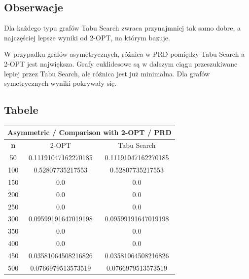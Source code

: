 \documentclass{article}
\begin{document}
\subsection{Obserwacje}

Dla każdego typu grafów Tabu Search zwraca przynajmniej tak samo dobre, a najczęściej lepsze wyniki od 2-OPT, na którym bazuje.

W przypadku grafów asymetrycznych, różnica w PRD pomiędzy Tabu Search a 2-OPT jest największa. Grafy euklidesowe są w dalszym ciągu przeszukiwane lepiej przez Tabu Search, ale różnica jest już minimalna. Dla grafów symetrycznych wyniki pokrywały się.


\subsection{Tabele}

\begin{center}
\begin{tabular}{|c|c|c|}
\hline
\multicolumn{3}{|c|}{\textbf{Asymmetric / Comparison with 2-OPT / PRD}}\\
\hline
\textbf{n} & 2-OPT & Tabu Search\\
\hline
50 & 0.11191047162270185 & 0.11191047162270185\\
\hline
100 & 0.52807735217553 & 0.52807735217553\\
\hline
150 & 0.0 & 0.0\\
\hline
200 & 0.0 & 0.0\\
\hline
250 & 0.0 & 0.0\\
\hline
300 & 0.09599191647019198 & 0.09599191647019198\\
\hline
350 & 0.0 & 0.0\\
\hline
400 & 0.0 & 0.0\\
\hline
450 & 0.03581064508216826 & 0.03581064508216826\\
\hline
500 & 0.0766979513573519 & 0.0766979513573519\\
\hline
\end{tabular}
\end{center}
\end{document}
